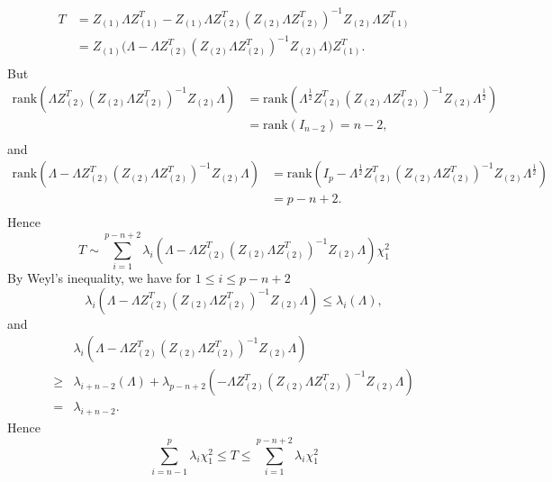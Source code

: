 \documentclass[review]{elsarticle}
\theoremstyle{plain}
\theoremstyle{definition}
\theoremstyle{remark}
\begin{document}
\begin{equation}
    \begin{aligned}
        T&=Z_{(1)}\Lambda Z_{(1)}^T-Z_{(1)}\Lambda Z_{(2)}^T{(Z_{(2)}\Lambda Z_{(2)}^T)}^{-1}Z_{(2)}\Lambda Z_{(1)}^T\\
        &=Z_{(1)}\big(\Lambda -\Lambda Z_{(2)}^T{(Z_{(2)}\Lambda Z_{(2)}^T)}^{-1}Z_{(2)}\Lambda \big)Z_{(1)}^T.\\
    \end{aligned}
\end{equation}
But
    \begin{equation}
        \begin{aligned}
    \textrm{rank}(\Lambda Z_{(2)}^T{(Z_{(2)}\Lambda Z_{(2)}^T)}^{-1}Z_{(2)}\Lambda)
            &=\textrm{rank}(\Lambda^{\frac{1}{2}} Z_{(2)}^T{(Z_{(2)}\Lambda Z_{(2)}^T)}^{-1}Z_{(2)}\Lambda^{\frac{1}{2}})\\
            &=\textrm{rank}(I_{n-2})=n-2,\\
        \end{aligned}
    \end{equation}
and
    \begin{equation}
        \begin{aligned}
    \textrm{rank}(\Lambda-\Lambda Z_{(2)}^T{(Z_{(2)}\Lambda Z_{(2)}^T)}^{-1}Z_{(2)}\Lambda)
            &=\textrm{rank}(I_p-\Lambda^{\frac{1}{2}} Z_{(2)}^T{(Z_{(2)}\Lambda Z_{(2)}^T)}^{-1}Z_{(2)}\Lambda^{\frac{1}{2}})\\
            &=p-n+2.\\
        \end{aligned}
    \end{equation}
    Hence
    \[
        T\sim\sum_{i=1}^{p-n+2} \lambda_{i}(\Lambda -\Lambda Z_{(2)}^T{(Z_{(2)}\Lambda Z_{(2)}^T)}^{-1}Z_{(2)}\Lambda) \chi^2_1
        \]
By Weyl's inequality, we have for $1\leq i\leq p-n+2$
\begin{equation}
    \lambda_i(\Lambda -\Lambda Z_{(2)}^T{(Z_{(2)}\Lambda Z_{(2)}^T)}^{-1}Z_{(2)}\Lambda)
    \leq \lambda_i(\Lambda),
\end{equation}
and
\begin{equation}
    \begin{aligned}
        &\lambda_i(\Lambda -\Lambda Z_{(2)}^T{(Z_{(2)}\Lambda Z_{(2)}^T)}^{-1}Z_{(2)}\Lambda)\\
        \geq& \lambda_{i+n-2}(\Lambda)+\lambda_{p-n+2}(-\Lambda Z_{(2)}^T{(Z_{(2)}\Lambda Z_{(2)}^T)}^{-1}Z_{(2)}\Lambda)\\
        =& \lambda_{i+n-2}.
    \end{aligned}
\end{equation}
Hence
\[
    \sum_{i=n-1}^p \lambda_i \chi^2_1\leq T\leq\sum_{i=1}^{p-n+2}\lambda_i \chi^2_1
    \]
\end{document}
